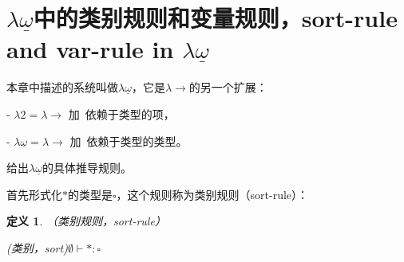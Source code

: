 \documentclass[UTF8]{article}
\newtheorem{thm}{定义}[section]
\begin{document}
	\section{$\lambda{\underline{\omega}}$中的类别规则和变量规则，sort-rule and var-rule in $\lambda{\underline{\omega}}$}
		\noindent
		本章中描述的系统叫做$\lambda{\underline{\omega}}$，它是$\lambda{\rightarrow}$的另一个扩展：
		
		\noindent
		- $\lambda{2} = \lambda{\rightarrow}$ 加\ 依赖于类型的项，
		
		\noindent
		- $\lambda{\underline{\omega}} = \lambda{\rightarrow}$ 加\ 依赖于类型的类型。
		
		给出$\lambda{\underline{\omega}}$的具体推导规则。
		
		首先形式化$*$的类型是$\square$，这个规则称为类别规则（sort-rule）：
		
		\begin{thm} （类别规则，sort-rule）
			
			(类别，sort)$\emptyset \vdash *:\square$
		\end{thm}
			
\end{document}
